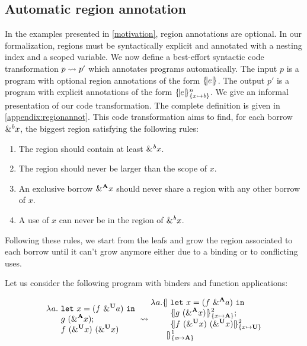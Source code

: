 
\subsection{Automatic region annotation}
\label{regionannot}

In the examples presented in \cref{motivation}, region annotations are optional.
In our formalization, regions must be syntactically explicit and annotated with
a nesting index and a scoped variable.
We now define a best-effort
syntactic code transformation $\RannotT{p}{p'}$ which
annotates programs automatically.
The input $p$ is a program with optional region annotations of the form $\region[]{}{e}$.
The output $p'$ is a program with explicit annotations
of the form $\region{\Sone x\BORROW}{e}$.
We give an informal presentation of our code transformation. The complete
definition is given in \cref{appendix:regionannot}. This code transformation
aims to find, for each borrow $\borrow{x}$, the biggest region satisfying
the following rules:
\begin{enumerate}
\item The region should contain at least $\borrow{x}$.
\item The region should never be larger than the scope of $x$.
\item An exclusive borrow $\borrow[\kaff]{x}$ should never share a region with any other borrow of $x$.
\item A use of $x$ can never be in the region of $\borrow{x}$.
\end{enumerate}
Following these rules, we start from the leafs and grow the region
associated to each borrow until it can't grow anymore either due to a binding
or to conflicting uses.

Let us consider the following program with binders and function applications:

\[
  \setlength{\jot}{-1pt}
  \RannotT{
\begin{aligned}
  \lam{a}{}\ &
  \letin{x}{\app{f}{\borrow[\kun]{a}}}{}\\
  &g\ (\borrow[\kaff]{x});\\
  &f\ (\borrow[\kun]{x})\ (\borrow[\kun]{x})\\
\end{aligned}
}{
\begin{aligned}
  \lam{a}{}\region[1]{\Sone a\MBORROW}{\ &%
  \letin{x}{\app{f}{\borrow[\kaff]{a}}}{}\\
  &\region[2]{\Sone x\MBORROW}{g\ (\borrow[\kaff]{x})};\\
  &\region[2]{\Sone x\IBORROW}{f\ (\borrow[\kun]{x})\ (\borrow[\kun]{x})}\\
  &\!\!\!}
\end{aligned}
}
\]


